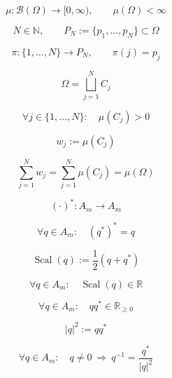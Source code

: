 \documentclass[12pt]{article}
\begin{document}
\begin{equation}
\mu:\mathcal{B}(\Omega)\to[0,\infty),\qquad \mu(\Omega)<\infty
\end{equation}

\begin{equation}
N\in\mathbb{N},\qquad P_N:=\{p_1,\dots,p_N\}\subset\Omega
\end{equation}

\begin{equation}
\pi:\{1,\dots,N\}\to P_N,\qquad \pi(j)=p_j
\end{equation}

\begin{equation}
\Omega=\bigsqcup_{j=1}^N C_j
\end{equation}

\begin{equation}
\forall j\in\{1,\dots,N\}:\quad \mu(C_j)>0
\end{equation}

\begin{equation}
w_j:=\mu(C_j)
\end{equation}

\begin{equation}
\sum_{j=1}^N w_j=\sum_{j=1}^N \mu(C_j)=\mu(\Omega)
\end{equation}

\begin{equation}
(\cdot)^* :A_m\to A_m
\end{equation}

\begin{equation}
\forall q\in A_m:\quad (q^*)^*=q
\end{equation}

\begin{equation}
\operatorname{Scal}(q):=\frac12(q+q^*)
\end{equation}

\begin{equation}
\forall q\in A_m:\quad \operatorname{Scal}(q)\in\mathbb{R}
\end{equation}

\begin{equation}
\forall q\in A_m:\quad qq^*\in\mathbb{R}_{\ge 0}
\end{equation}

\begin{equation}
|q|^2:=qq^*
\end{equation}

\begin{equation}
\forall q\in A_m:\quad q\neq 0\ \Longrightarrow\ q^{-1}=\frac{q^*}{|q|^2}
\end{equation}
\end{document}
